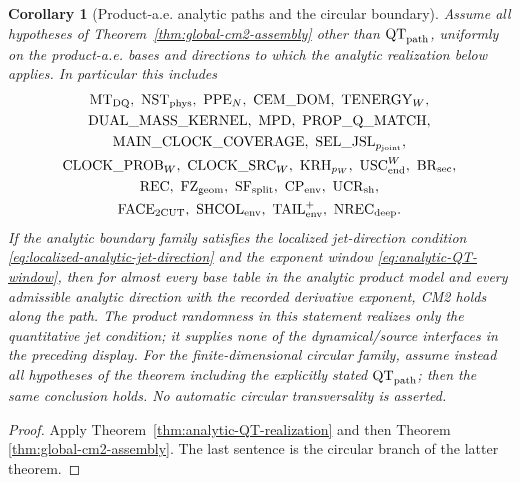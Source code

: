 \documentclass[11pt]{article}
\newtheorem{corollary}[theorem]{Corollary}
\begin{document}
\begin{corollary}[Product-a.e. analytic paths and the circular boundary]
\label{cor:analytic-pathwise-CM2}
Assume all hypotheses of Theorem~\ref{thm:global-cm2-assembly} other than
$\mathrm{QT}_{\rm path}$, uniformly on the product-a.e. bases and directions
to which the analytic realization below applies.  In
particular this includes
\[
\begin{gathered}
 \mathrm{MT}_{\rm DQ},\ \mathrm{NST}_{\rm phys},\ \mathrm{PPE}_{N},\
 \mathrm{CEM\_DOM},\ \mathrm{TENERGY}_{W},\\
 \mathrm{DUAL\_MASS\_KERNEL},\ \mathrm{MPD},\
 \mathrm{PROP\_Q\_MATCH},\\
 \mathrm{MAIN\_CLOCK\_COVERAGE},\
 \mathrm{SEL\_JSL}_{p_{\rm joint}},\\
 \mathrm{CLOCK\_PROB}_{W},\ \mathrm{CLOCK\_SRC}_{W},\
 \mathrm{KRH}_{p_W},\ \mathrm{USC}_{\rm end}^{W},\ \mathrm{BR}_{\rm sec},\\
 \mathrm{REC},\ \mathrm{FZ}_{\rm geom},\ \mathrm{SF}_{\rm split},\
 \mathrm{CP}_{\rm env},\ \mathrm{UCR}_{\rm sh},\\
 \mathrm{FACE}_{\rm 2CUT},\ \mathrm{SHCOL}_{\rm env},\
 \mathrm{TAIL}_{\rm env}^{+},\ \mathrm{NREC}_{\rm deep}.
\end{gathered}
\]
If the analytic boundary family
satisfies the localized jet-direction condition
\eqref{eq:localized-analytic-jet-direction} and the exponent window
\eqref{eq:analytic-QT-window}, then for almost every base table in the
analytic product model and every admissible analytic direction with the
recorded derivative exponent, CM2 holds along the path.
The product randomness in this statement realizes only the quantitative jet
condition; it supplies none of the dynamical/source interfaces in the
preceding display.
For the finite-dimensional circular family, assume instead all hypotheses
of the theorem including the explicitly stated $\mathrm{QT}_{\rm path}$;
then the same conclusion holds.  No automatic circular transversality is
asserted.
\end{corollary}

\begin{proof}
Apply Theorem~\ref{thm:analytic-QT-realization} and then Theorem
\ref{thm:global-cm2-assembly}.  The last sentence is the circular branch of
the latter theorem.
\end{proof}
\end{document}
